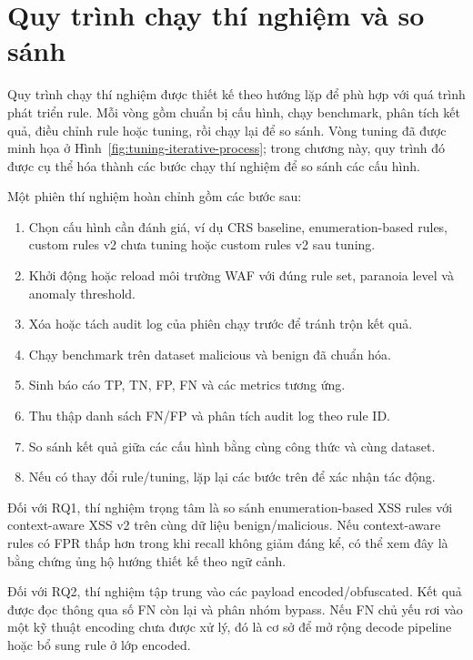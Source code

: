 \section{Quy trình chạy thí nghiệm và so sánh}
\label{sec:experiment-procedure}

Quy trình chạy thí nghiệm được thiết kế theo hướng lặp để phù hợp với quá trình phát triển rule. Mỗi vòng gồm chuẩn bị cấu hình, chạy benchmark, phân tích kết quả, điều chỉnh rule hoặc tuning, rồi chạy lại để so sánh. Vòng tuning đã được minh họa ở Hình~\ref{fig:tuning-iterative-process}; trong chương này, quy trình đó được cụ thể hóa thành các bước chạy thí nghiệm để so sánh các cấu hình.

Một phiên thí nghiệm hoàn chỉnh gồm các bước sau:

\begin{enumerate}
    \item Chọn cấu hình cần đánh giá, ví dụ CRS baseline, enumeration-based rules, custom rules v2 chưa tuning hoặc custom rules v2 sau tuning.
    \item Khởi động hoặc reload môi trường WAF với đúng rule set, paranoia level và anomaly threshold.
    \item Xóa hoặc tách audit log của phiên chạy trước để tránh trộn kết quả.
    \item Chạy benchmark trên dataset malicious và benign đã chuẩn hóa.
    \item Sinh báo cáo TP, TN, FP, FN và các metrics tương ứng.
    \item Thu thập danh sách FN/FP và phân tích audit log theo rule ID.
    \item So sánh kết quả giữa các cấu hình bằng cùng công thức và cùng dataset.
    \item Nếu có thay đổi rule/tuning, lặp lại các bước trên để xác nhận tác động.
\end{enumerate}

Đối với RQ1, thí nghiệm trọng tâm là so sánh enumeration-based XSS rules với context-aware XSS v2 trên cùng dữ liệu benign/malicious. Nếu context-aware rules có FPR thấp hơn trong khi recall không giảm đáng kể, có thể xem đây là bằng chứng ủng hộ hướng thiết kế theo ngữ cảnh.

Đối với RQ2, thí nghiệm tập trung vào các payload encoded/obfuscated. Kết quả được đọc thông qua số FN còn lại và phân nhóm bypass. Nếu FN chủ yếu rơi vào một kỹ thuật encoding chưa được xử lý, đó là cơ sở để mở rộng decode pipeline hoặc bổ sung rule ở lớp encoded.

